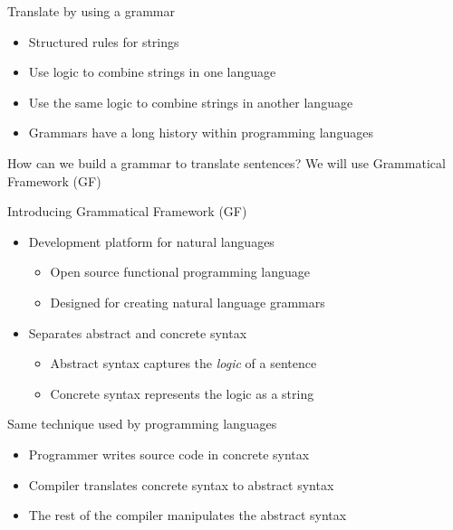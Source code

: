 \documentclass{beamer}
\begin{document}
\begin{frame}{Translate by using a grammar} 
         \begin{itemize}
           \item Structured rules for strings \pause
           \item Use logic to combine strings in one language \pause
           \item Use the same logic to combine strings in another language \pause
           \item Grammars have a long history within programming languages\pause
         \end{itemize}
           \begin{block}{How can we build a grammar to translate sentences?}
              We will use Grammatical Framework (GF)
         \end{block}
\end{frame}

\begin{frame}{Introducing Grammatical Framework (GF)} 
         \begin{itemize}
           \item Development platform for natural languages \pause
           \begin{itemize}
              \item Open source functional programming language \pause
              \item Designed for creating natural language grammars
           \end{itemize}\pause
           \item Separates abstract and concrete syntax \pause
           \begin{itemize}
              \item Abstract syntax captures the \emph{logic} of a sentence \pause
              \item Concrete syntax represents the logic as a string
           \end{itemize}\pause
         \end{itemize}
         
           \begin{block}{Same technique used by programming languages}
             \begin{itemize}
               \item Programmer writes source code in concrete syntax \pause
               \item Compiler translates concrete syntax to abstract syntax \pause
               \item The rest of the compiler manipulates the abstract syntax
             \end{itemize}
         \end{block}
         
\end{frame}
\end{document}
